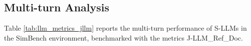 \subsection{Multi-turn Analysis}

Table \ref{tab:llm_metrics_jllm} reports the multi-turn performance of S-LLMs in the SimBench environment, benchmarked with the metrics J-LLM\_Ref\_Doc. 

